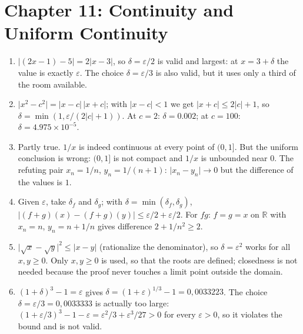 \section*{Chapter 11: Continuity and Uniform Continuity}
\begin{enumerate}[label=\textbf{11.\arabic*}]
  \item $\lvert(2x-1)-5\rvert=2\lvert x-3\rvert$, so $\delta=\varepsilon/2$ is
        valid and largest: at $x=3+\delta$ the value is exactly $\varepsilon$.
        The choice $\delta=\varepsilon/3$ is also valid, but it uses only a third of the
        room available.

  \item $\lvert x^{2}-c^{2}\rvert=\lvert x-c\rvert\,\lvert x+c\rvert$; with
        $\lvert x-c\rvert<1$ we get $\lvert x+c\rvert\le2\lvert c\rvert+1$,
        so $\delta=\min(1,\varepsilon/(2\lvert c\rvert+1))$. At $c=2$:
        $\delta=0.002$; at $c=100$: $\delta=4.975\times10^{-5}$.

  \item Partly true. $1/x$ is indeed continuous at every point of $(0,1]$. But the
        uniform conclusion is wrong: $(0,1]$ is not compact and $1/x$ is unbounded
        near $0$. The refuting pair $x_{n}=1/n$, $y_{n}=1/(n+1)$:
        $\lvert x_{n}-y_{n}\rvert\to0$ but the difference of the values is $1$.

  \item Given $\varepsilon$, take $\delta_{f}$ and $\delta_{g}$; with
        $\delta=\min(\delta_{f},\delta_{g})$,
        $\lvert(f+g)(x)-(f+g)(y)\rvert\le\varepsilon/2+\varepsilon/2$.
        For $fg$: $f=g=x$ on $\mathbb{R}$ with $x_{n}=n$,
        $y_{n}=n+1/n$ gives difference $2+1/n^{2}\ge2$.

  \item $\lvert\sqrt x-\sqrt y\rvert^{2}\le\lvert x-y\rvert$ (rationalize the
        denominator), so $\delta=\varepsilon^{2}$ works for all
        $x,y\ge0$. Only $x,y\ge0$ is used, so that the roots are defined;
        closedness is not needed because the proof never touches a limit point outside
        the domain.

  \item 
$(1+\delta)^{3}-1=\varepsilon$ gives
        $\delta=(1+\varepsilon)^{1/3}-1=0{,}0033223$. The choice
        $\delta=\varepsilon/3=0{,}0033333$ is actually too large:
        $(1+\varepsilon/3)^{3}-1-\varepsilon=\varepsilon^{2}/3+\varepsilon^{3}/27>0$
        for every $\varepsilon>0$, so it violates the bound and is not valid.


\end{enumerate}
